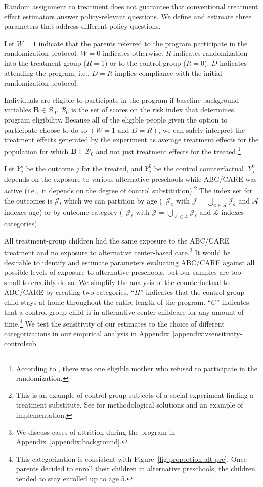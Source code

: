 Random assignment to treatment does not guarantee that conventional treatment effect estimators answer policy-relevant questions. We define and estimate three parameters that address different policy questions.

Let $W=1$ indicate that the parents referred to the program participate in the randomization protocol. $W=0$ indicates otherwise. $R$ indicates randomization into the treatment group ($R = 1$) or to the control group ($R = 0$). $D$ indicates attending the program, i.e., $D = R$ implies compliance with the initial randomization protocol.

Individuals are eligible to participate in the program if baseline background variables $\bm{B}\in\mathcal{B}_0$. $\mathcal{B}_0$ is the set of scores on the risk index that determines program eligibility. Because all of the eligible people given the option to participate choose to do so $(W=1\text{ and } D=R)$, we can safely interpret the treatment effects generated by the experiment as average treatment effects for the population for which $\bm{B}\in\mathcal{B}_0$ and not just treatment effects for the treated.\footnote{According to \citet{Ramey_Yeates_Short_1984_CD}, there was one eligible mother who refused to participate in the randomization.}

Let $Y^1_{j}$ be the outcome $j$ for the treated, and $Y^0_{j}$ be the control counterfactual. $Y^0_{j}$ depends on the exposure to various alternative preschools while ABC/CARE was active (i.e.,\ it depends on the degree of control substitution).\footnote{This is an example of control-group subjects of a social experiment finding a treatment substitute. See \cite{Heckman_Hohmann_etal_2000_QJE} for methodological solutions and an example of implementation.} The index set for the outcomes is $\mathcal{J}$, which we can partition by age (\ $\mathcal{J}_a$ with $\mathcal{J} = \bigcup \limits _{a \in \mathcal{A}} \mathcal{J}_a$ and $\mathcal{A}$ indexes age) or by outcome category (\ $\mathcal{J}_\ell$ with $\mathcal{J} = \bigcup \limits _{\ell \in \mathcal{L}} \mathcal{J}_\ell$ and $\mathcal{L}$ indexes categories).

 All treatment-group children had the same exposure to the ABC/CARE treatment and no exposure to alternative center-based care.\footnote{We discuss cases of attrition during the program in Appendix~\ref{appendix:background}.} It would be desirable to identify and estimate parameters evaluating ABC/CARE against all possible levels of exposure to alternative preschools, but our samples are too small to credibly do so. We simplify the analysis of the counterfactual to ABC/CARE by creating two categories. ``$H$'' indicates that the control-group child stays at home throughout the entire length of the program. ``$C$'' indicates that a control-group child is in alternative center childcare for any amount of time.\footnote{This categorization is consistent with Figure~\ref{fig:proportion-alt-pre}. Once parents decided to enroll their children in alternative preschools, the children tended to stay enrolled up to age 5.} We test the sensitivity of our estimates to the choice of different categorizations in our empirical analysis in Appendix~\ref{appendix:vsensitivity-controlsub}.

